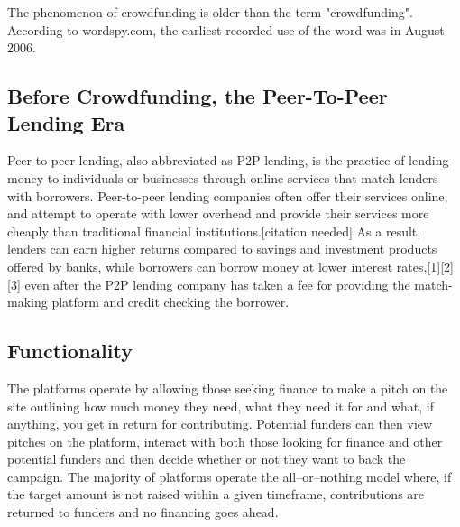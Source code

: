 The phenomenon of crowdfunding is older than the term "crowdfunding". According to wordspy.com, the earliest recorded use of the word was in August 2006.
\subsection*{ Before Crowdfunding, the Peer-To-Peer Lending Era }
Peer-to-peer lending, also abbreviated as P2P lending, is the practice of lending money to individuals or businesses through online services that match lenders with borrowers. Peer-to-peer lending companies often offer their services online, and attempt to operate with lower overhead and provide their services more cheaply than traditional financial institutions.[citation needed] As a result, lenders can earn higher returns compared to savings and investment products offered by banks, while borrowers can borrow money at lower interest rates,[1][2][3] even after the P2P lending company has taken a fee for providing the match-making platform and credit checking the borrower.

\subsection*{Functionality }
The platforms operate by allowing those seeking finance to make a pitch on the site outlining
how much money they need, what they need it for and what, if anything, you get in return for
contributing. Potential funders can then view pitches on the platform, interact with both those
looking for finance and other potential funders and then decide whether or not they want to
back the campaign. The majority of platforms operate the all–or–nothing model where, if the
target amount is not raised within a given timeframe, contributions are returned to funders and
no financing goes ahead.
